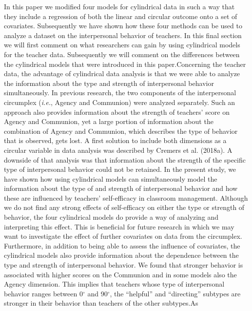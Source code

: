 \documentclass[man]{apa6}
\theoremstyle{definition}
\theoremstyle{definition}
\theoremstyle{definition}
\theoremstyle{remark}
\begin{document}
In this paper we modified four models for cylindrical data in such a way
that they include a regression of both the linear and circular outcome
onto a set of covariates. Subsequently we have shown how these four
methods can be used to analyze a dataset on the interpersonal behavior
of teachers. In this final section we will first comment on what
researchers can gain by using cylindrical models for the teacher data.
Subsequently we will comment on the differences between the cylindrical
models that were introduced in this paper.\newline \indent Concerning
the teacher data, the advantage of cylindrical data analysis is that we
were able to analyze the information about the type and strength of
interpersonal behavior simultaneously. In previous research, the two
components of the interpersonal circumplex (\emph{i.e.}, Agency and
Communion) were analyzed separately. Such an approach also provides
information about the strength of teachers' score on Agency and
Communion, yet a large portion of information about the combination of
Agency and Communion, which describes the type of behavior that is
observed, gets lost. A first solution to include both dimensions as a
circular variable in data analysis was described by Cremers et al.
(2018a). A downside of that analysis was that information about the
strength of the specific type of interpersonal behavior could not be
retained. In the present study, we have shown how using cylindrical
models can simultaneously model the information about the type of and
strength of interpersonal behavior and how these are influenced by
teachers' self-efficacy in classroom management. Although we do not find
any strong effects of self-efficacy on either the type or strength of
behavior, the four cylindrical models do provide a way of analyzing and
interpreting this effect. This is beneficial for future research in
which we may want to investigate the effect of further covariates on
data from the circumplex. \newline \indent Furthermore, in addition to
being able to assess the influence of covariates, the cylindrical models
also provide information about the dependence between the type and
strength of interpersonal behavior. We found that stronger behavior is
associated with higher scores on the Communion and in some models also
the Agency dimension. This implies that teachers whose type of
interpersonal behavior ranges between 0\(^\circ\) and 90\(^\circ\), the
\enquote{helpful} and \enquote{directing} subtypes are stronger in their
behavior than teachers of the other subtypes.\newline \indent As
\end{document}
